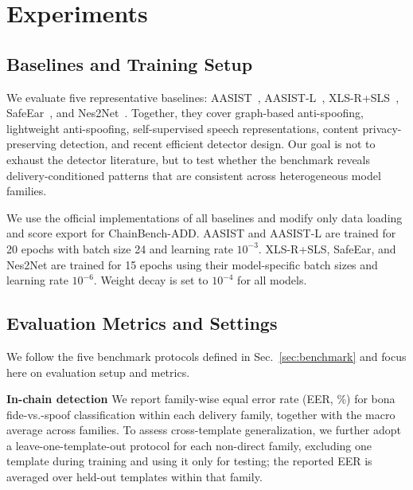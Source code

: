 \section{Experiments}
\label{sec:experiments}

\subsection{Baselines and Training Setup}
We evaluate five representative baselines: AASIST~\cite{Jung2021AASIST}, AASIST-L~\cite{Jung2021AASIST}, XLS-R+SLS~\cite{sls}, SafeEar~\cite{li2024safeear}, and Nes2Net~\cite{Nes2Net}. Together, they cover graph-based anti-spoofing, lightweight anti-spoofing, self-supervised speech representations, content privacy-preserving detection, and recent efficient detector design. Our goal is not to exhaust the detector literature, but to test whether the benchmark reveals delivery-conditioned patterns that are consistent across heterogeneous model families.

We use the official implementations of all baselines and modify only data loading and score export for ChainBench-ADD. AASIST and AASIST-L are trained for 20 epochs with batch size 24 and learning rate $10^{-3}$. XLS-R+SLS, SafeEar, and Nes2Net are trained for 15 epochs using their model-specific batch sizes and learning rate $10^{-6}$. Weight decay is set to $10^{-4}$ for all models.


\subsection{Evaluation Metrics and Settings}
We follow the five benchmark protocols defined in Sec.~\ref{sec:benchmark} and focus here on evaluation setup and metrics.

\noindent\textbf{In-chain detection}
We report family-wise equal error rate (EER, \%) for bona fide-vs.-spoof classification within each delivery family, together with the macro average across families. To assess cross-template generalization, we further adopt a leave-one-template-out protocol for each non-direct family, excluding one template during training and using it only for testing; the reported EER is averaged over held-out templates within that family.


